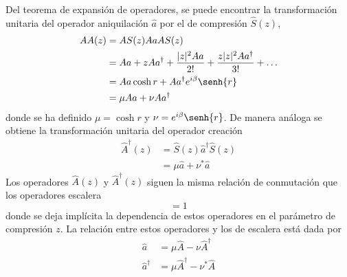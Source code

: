 Del teorema de expansión de operadores, se puede encontrar la transformación unitaria del operador aniquilación $\hat{a}$ por el de compresión $\hat{S}(z)$,
\begin{align*}
  \hat{A}(z) & = \hat{S}(z)\hat{a} \hat{S}(z)                                                                       \\
             & = \hat{a}  + z\hat{a}^{\dagger} + \frac{|z|^2\hat{a}}{2!} + \frac{z|z|^2\hat{a}^{\dagger}}{3!}+\dots \\
             & = \hat{a} \cosh{r} + \hat{a}^{\dagger} e^{i\beta}\senh{r}                                            \\
             & = \mu\hat{a} + \nu\hat{a}^{\dagger}
\end{align*}
donde se ha definido $\mu = \cosh{r}$ y $\nu = e^{i\beta}\senh{r}$. De manera análoga se obtiene la transformación unitaria del operador creación
\begin{align*}
  \hat{A}^{\dagger}(z) & = \hat{S}(z)\hat{a}^{\dagger} \hat{S}(z) \\
                       & = \mu\hat{a} + \nu^* \hat{a}
\end{align*}
Los operadores $\hat{A}(z)$ y $\hat{A}^\dagger(z)$ siguen la misma relación de conmutación que los operadores escalera
\begin{equation*}
  [\hat{A}, \hat{A}^{\dagger})] = 1
\end{equation*}
donde se deja implícita la dependencia de estos operadores en el parámetro de compresión $z$. La relación entre estos operadores y los de escalera está dada por
\begin{align*}
  \hat{a}           & = \mu \hat{A} - \nu \hat{A}^\dagger   \\
  \hat{a}^{\dagger} & = \mu \hat{A}^\dagger - \nu^* \hat{A}
\end{align*}

